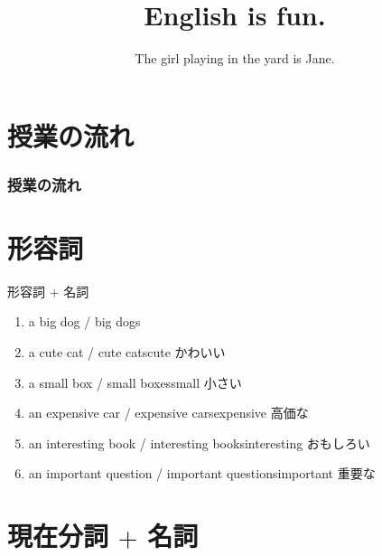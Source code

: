 \documentclass[aspectratio=169,xcolor={dvipsnames,table}]{beamer}
\title{English is fun.}
\subtitle{The girl playing in the yard is Jane.}
\author{}
\institute[]{}
\date[]
\begin{document}
\begin{frame}[plain]
  \titlepage
\end{frame}

\section*{授業の流れ}
\begin{frame}[plain]
  \frametitle{授業の流れ}
  \tableofcontents
\end{frame}

\section{形容詞}
 \begin{frame}[plain]{形容詞 $+$ 名詞}
 \begin{enumerate}
  \item a big dog / big dogs
  \item a cute cat / cute cats\hfill{\scriptsize cute  かわいい}
  \item a small box / small boxes\hfill{\scriptsize small  小さい}
  \item an expensive car / expensive cars\hfill{\scriptsize expensive  高価な}
  \item an interesting book / interesting books\hfill{\scriptsize interesting  おもしろい}
  \item an important question / important questions\hfill{\scriptsize important  重要な}
 \end{enumerate}

\mbox{}\hfill{\scriptsize {}}
 \end{frame}
\section{現在分詞 $+$ 名詞}
\end{document}
